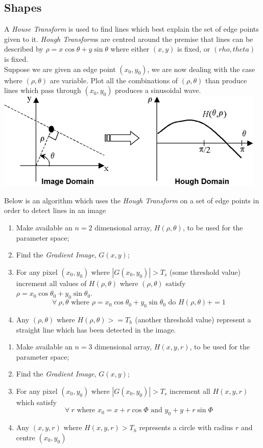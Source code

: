 \documentclass[11pt,a4paper]{article}
\begin{document}
\subsection{Shapes}

A \textit{House Transform} is used to find lines which best explain the set of edge points given to it. \textit{Hough Transform}s are centred around the premise that lines can be described by ${\rho=x\cos\theta+y\sin\theta}$ where either $(x,y)$ is fixed, or $(rho,theta)$ is fixed.\\
Suppose we are given an edge point $(x_0,y_0)$, we are now dealing with the case where $(\rho,\theta)$ are variable. Plot all the combinations of $(\rho,\theta)$ than produce lines which pass through $(x_0,y_0)$ produces a sinusoidal wave.\\
\includegraphics[scale=.7]{img/houghTransform.png}

Below is an algorithm which uses the \textit{Hough Transform} on a set of edge points in order to detect lines in an image
\begin{enumerate}[label=\roman*)]
	\item Make available an $n=2$ dimensional array, $H(\rho,\theta)$, to be used for the parameter space;
	\item Find the \textit{Gradient Image}, $G(x,y)$;
	\item For any pixel $(x_0,y_0)$ where $|G(x_0,y_0)|>T_s$ (some threshold value) increment all values of $H(\rho,\theta)$ where $(\rho,\theta)$ satisfy $\rho=x_0\cos\theta_0+y_0\sin\theta_0$.
	$$\forall\ \rho,\theta\text{ where }\rho=x_0\cos\theta_0+y_0\sin\theta_0\text{ do }H(\rho,\theta)+=1$$
	\item Any $(\rho,\theta)$ where $H(\rho,\theta)>=T_h$ (another threshold value) represent a straight line which has been detected in the image.
\end{enumerate}

\begin{enumerate}[label=\roman*)]
	\item Make available an $n=3$ dimensional array, $H(x,y,r)$, to be used for the parameter space;
	\item Find the \textit{Gradient Image}, $G(x,y)$;
	\item For any pixel $(x_0,y_0)$ where $|G(x_0,y_0)|>T_s$ increment all $H(x,y,r)$ which satisfy
	$$\forall\ r\text{ where }x_0=x+r\cos\Phi\text{ and }y_0+y+r\sin\Phi$$
	\item Any $(x,y,r)$ where $H(x,y,r)>T_h$ represents a circle with radius $r$ and centre $(x_0,y_0)$
\end{enumerate}
\end{document}
